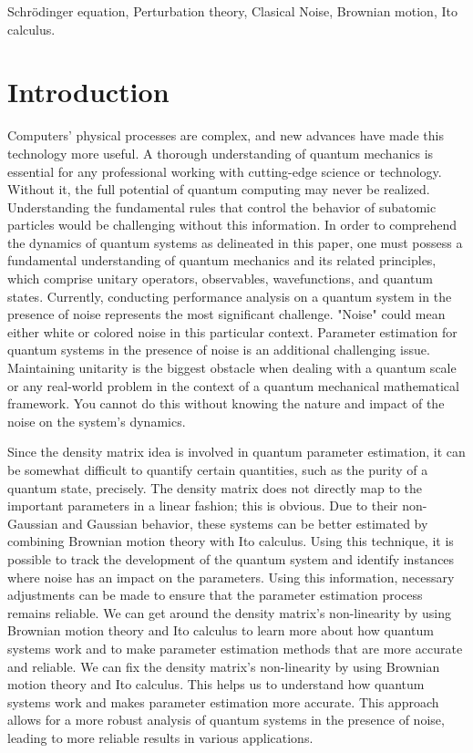 \documentclass[journal,twocolumn]{IEEEtran}
\begin{document}
\begin{IEEEkeywords}
Schr\"{o}dinger equation, Perturbation theory, Clasical Noise, Brownian motion, Ito calculus.	 
\end{IEEEkeywords}

\section{Introduction}
 Computers' physical processes are complex, and new advances have made this technology more useful. A thorough understanding of quantum mechanics is essential for any professional working with cutting-edge science or technology. Without it, the full potential of quantum computing may never be realized. Understanding the fundamental rules that control the behavior of subatomic particles would be challenging without this information. In order to comprehend the dynamics of quantum systems as delineated in this paper, one must possess a fundamental understanding of quantum mechanics and its related principles, which comprise unitary operators, observables, wavefunctions, and quantum states. Currently, conducting performance analysis on a quantum system in the presence of noise represents the most significant challenge. "Noise" could mean either white or colored noise in this particular context.  Parameter estimation for quantum systems in the presence of noise is an additional challenging issue. Maintaining unitarity is the biggest obstacle when dealing with a quantum scale or any real-world problem in the context of a quantum mechanical mathematical framework. You cannot do this without knowing the nature and impact of the noise on the system's dynamics.

Since the density matrix idea is involved in quantum parameter estimation, it can be somewhat difficult to quantify certain quantities, such as the purity of a quantum state, precisely. The density matrix does not directly map to the important parameters in a linear fashion; this is obvious. Due to their non-Gaussian and Gaussian behavior, these systems can be better estimated by combining Brownian motion theory with Ito calculus. Using this technique, it is possible to track the development of the quantum system and identify instances where noise has an impact on the parameters. Using this information, necessary adjustments can be made to ensure that the parameter estimation process remains reliable. We can get around the density matrix's non-linearity by using Brownian motion theory and Ito calculus to learn more about how quantum systems work and to make parameter estimation methods that are more accurate and reliable.  We can fix the density matrix's non-linearity by using Brownian motion theory and Ito calculus. This helps us to understand how quantum systems work and makes parameter estimation more accurate. This approach allows for a more robust analysis of quantum systems in the presence of noise, leading to more reliable results in various applications.
\end{document}
